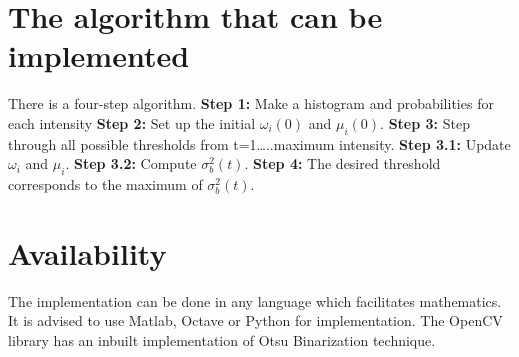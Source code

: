 \documentclass[BTech]{srmuthesis}
\begin{document}
\section{The algorithm that can be implemented}
There is a four-step algorithm.
\newline
\textbf{Step 1:} Make a histogram and probabilities for each intensity
\newline
\textbf{Step 2:} Set up the initial $\omega_{i}(0)$ and $\mu_{i}(0)$.
\newline
\textbf{Step 3:} Step through all possible thresholds from t=1…..maximum intensity.
\newline
\textbf{Step 3.1:} Update $\omega_{i}$ and $\mu_{i}$.
\newline
\textbf{Step 3.2:} Compute $\sigma^{2}_{b}(t)$.
\newline
\textbf{Step 4:} The desired threshold corresponds to the maximum of $\sigma^{2}_{b}(t)$.

\section{Availability}
The implementation can be done in any language which facilitates mathematics. It is advised to use Matlab, Octave or Python for implementation. The OpenCV library has an inbuilt implementation of Otsu Binarization technique.


\end{document}
